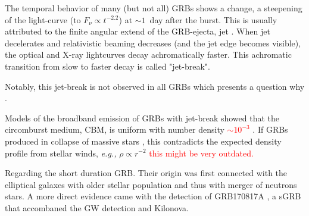 \documentclass[11pt,a4paper,headinclude=true,DIV=14,BCOR=8mm,chapterprefix,listof=totoc,twoside,openright,abstracton]{scrbook}
\newcommand{\red}[1]{\textcolor{red}{#1}}
\newcommand{\gray}[1]{\textcolor{gray}{#1}}
\begin{document}
The temporal behavior of many (but not all) GRBs shows a change, a steepening of the light-curve (to $F_{\nu}\propto t^{-2.2}$) at $\sim 1$~day after the burst. This is usually attributed to the 
finite angular extend of the GRB-ejecta, jet \cite{Rhoads, 1999, Sari et al., 1999}. When jet decelerates and relativistic beaming decreases (and the jet edge becomes visible), the optical and X-ray lightcurves decay achromatically faster. This achromatic transition from slow to faster decay is called "jet-break".

Notably, this jet-break is not observed in all GRBs which presents a question why
\cite{(Fan and Piran, 2006a; Panaitescu et al., 2006a; Liang et al., 2007b; Sato et al., 2007; Liang et al., 2008a; Curran et al., 2008; Racusin et al., 2009)}.

Models of the broadband emission of GRBs with jet-break showed that the circomburst medium, CBM, is uniform with number density \red{$\sim 10^{-3}$} \cite{(Panaitescu and Kumar, 2002)}. If GRBs produced in collapse of massive stars \cite{Woosley (1993); Paczynski (1998)}, this contradicts the expected density profile from stellar winds, \textit{e.g.,} $\rho\propto r^{-2}$ \cite{Dai and Lu, 1998b; Chevalier and Li, 1999, 2000; Ramirez-Ruiz et al., 2001)} \red{this might be very outdated.}

Regarding the short duration GRB. Their origin was first connected with the elliptical galaxes with older stellar population \cite{Gehrels et al., 2005; Fox et al., 2005; Barthelmy et al., 2005c; Berger et al., 2005; Panaitescu, 2006; Bloom et al., 2006; Guetta and Piran, 2006; Nakar, 2007} and thus with merger of neutrons stars. A more direct evidence came with the detection of GRB170817A \cite{Abbott et al 2017}, a sGRB that accombaned the GW detection and Kilonova.
\end{document}
